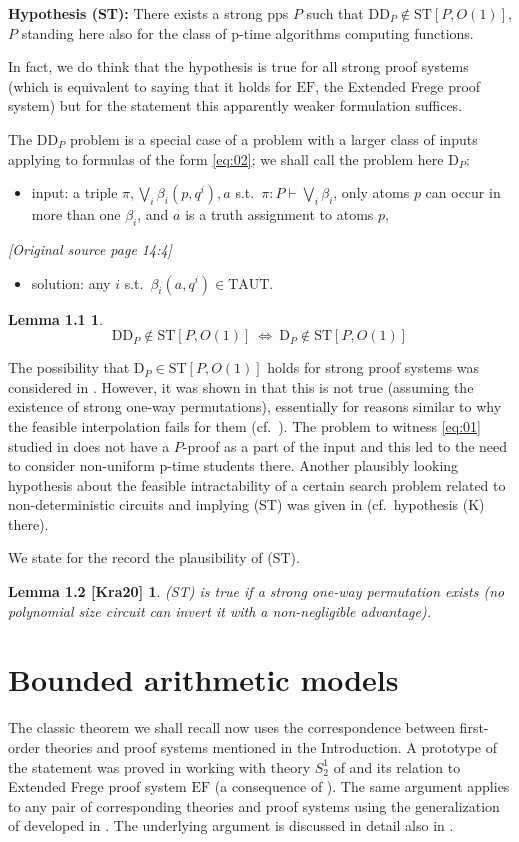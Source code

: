 \documentclass[11pt]{article}
\newcommand{\TAUT}{\mathrm{TAUT}}
\newcommand{\ST}{\mathrm{ST}}
\newcommand{\DDP}{\mathrm{DD}_P}
\newcommand{\DP}{\mathrm{D}_P}
\newcommand{\EF}{\mathrm{EF}}
\newcommand{\sourcepage}[1]{\par\Needspace{5\baselineskip}\bigskip\noindent\textit{[Original source page 14:#1]}\par\medskip}
\newtheorem*{sourcelemmaoneone}{Lemma 1.1}
\newtheorem*{sourcelemmaonetwo}{Lemma 1.2 \textnormal{[Kra20]}}
\begin{document}
\noindent\textbf{Hypothesis (ST):} There exists a strong pps $P$ such that $\DDP\notin\ST[P,O(1)]$, $P$ standing here also for the class of p-time algorithms computing functions.

In fact, we do think that the hypothesis is true for all strong proof systems (which is equivalent to saying that it holds for $\EF$, the Extended Frege proof system) but for the statement this apparently weaker formulation suffices.

The $\DDP$ problem is a special case of a problem with a larger class of inputs applying to formulas of the form \eqref{eq:02}; we shall call the problem here $\DP$:
\begin{itemize}
\item input: a triple $\pi,\bigvee_i\beta_i(p,q^i),a$ s.t.\ $\pi:P\vdash\bigvee_i\beta_i$, only atoms $p$ can occur in more than one $\beta_i$, and $a$ is a truth assignment to atoms $p$,
\end{itemize}

\sourcepage{4}
\begin{itemize}
\item solution: any $i$ s.t.\ $\beta_i(a,q^i)\in\TAUT$.
\end{itemize}
\begin{sourcelemmaoneone}
\[
\DDP\notin\ST[P,O(1)]\ \Leftrightarrow\ \DP\notin\ST[P,O(1)]
\]
\end{sourcelemmaoneone}
The possibility that $\DP\in\ST[P,O(1)]$ holds for strong proof systems was considered in \cite{PS21}. However, it was shown in \cite{Kra20} that this is not true (assuming the existence of strong one-way permutations), essentially for reasons similar to why the feasible interpolation fails for them (cf.\ \cite[Chpt.18]{Kra19}). The problem to witness \eqref{eq:01} studied in \cite{Kra11} does not have a $P$-proof as a part of the input and this led to the need to consider non-uniform p-time students there. Another plausibly looking hypothesis about the feasible intractability of a certain search problem related to non-deterministic circuits and implying (ST) was given in \cite{Kra25} (cf.\ hypothesis (K) there).

We state for the record the plausibility of (ST).
\begin{sourcelemmaonetwo}
(ST) is true if a strong one-way permutation exists (no polynomial size circuit can invert it with a non-negligible advantage).
\end{sourcelemmaonetwo}
\section{Bounded arithmetic models}
The classic theorem we shall recall now uses the correspondence between first-order theories and proof systems mentioned in the Introduction. A prototype of the statement was proved in \cite[Thm.1]{KP90} working with theory $S^1_2$ of \cite{Bus86} and its relation to Extended Frege proof system $\EF$ (a consequence of \cite{Coo75}). The same argument applies to any pair of corresponding theories and proof systems using the generalization of \cite{Coo75} developed in \cite{KP89}. The underlying argument is discussed in detail also in \cite[Sec.20.1]{Kra19}.
\end{document}

